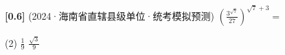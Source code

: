 \documentclass[varwidth=16cm, border=2mm]{standalone}
\begin{document}
\textbf{[0.6]} (2024·海南省直辖县级单位·统考模拟预测) $(\frac{3^{\sqrt{7}}}{27})^{\sqrt{7}+3}=$

\begin{tasks}(2)
    \task $\frac{1}{9}$
    \task $\frac{\sqrt{3}}{9}$
\end{tasks}
\end{document}
